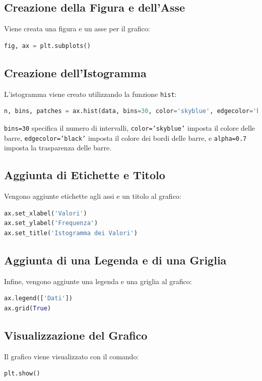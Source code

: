\documentclass[a4paper,12pt]{article}
\begin{document}
\subsection{Creazione della Figura e dell'Asse}
Viene creata una figura e un asse per il grafico:
\begin{lstlisting}[language=Python]
fig, ax = plt.subplots()
\end{lstlisting}

\subsection{Creazione dell'Istogramma}
L'istogramma viene creato utilizzando la funzione \texttt{hist}:
\begin{lstlisting}[language=Python]
n, bins, patches = ax.hist(data, bins=30, color='skyblue', edgecolor='black', alpha=0.7)
\end{lstlisting}
\texttt{bins=30} specifica il numero di intervalli, \texttt{color='skyblue'} imposta il colore delle barre, \texttt{edgecolor='black'} imposta il colore dei bordi delle barre, e \texttt{alpha=0.7} imposta la trasparenza delle barre.

\subsection{Aggiunta di Etichette e Titolo}
Vengono aggiunte etichette agli assi e un titolo al grafico:
\begin{lstlisting}[language=Python]
ax.set_xlabel('Valori')
ax.set_ylabel('Frequenza')
ax.set_title('Istogramma dei Valori')
\end{lstlisting}

\subsection{Aggiunta di una Legenda e di una Griglia}
Infine, vengono aggiunte una legenda e una griglia al grafico:
\begin{lstlisting}[language=Python]
ax.legend(['Dati'])
ax.grid(True)
\end{lstlisting}

\subsection{Visualizzazione del Grafico}
Il grafico viene visualizzato con il comando:
\begin{lstlisting}[language=Python]
plt.show()
\end{lstlisting}
\end{document}
